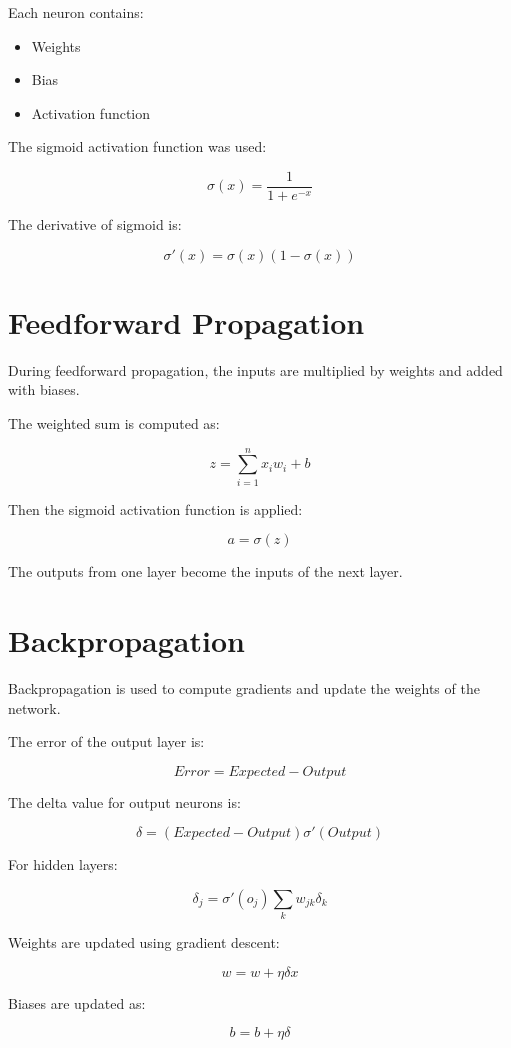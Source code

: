 \documentclass[a4paper,12pt]{article}
\begin{document}
Each neuron contains:
\begin{itemize}
    \item Weights
    \item Bias
    \item Activation function
\end{itemize}

The sigmoid activation function was used:

\[
\sigma(x) = \frac{1}{1 + e^{-x}}
\]

The derivative of sigmoid is:

\[
\sigma'(x) = \sigma(x)(1 - \sigma(x))
\]

\section{Feedforward Propagation}

During feedforward propagation, the inputs are multiplied by weights and added with biases.

The weighted sum is computed as:

\[
z = \sum_{i=1}^{n} x_i w_i + b
\]

Then the sigmoid activation function is applied:

\[
a = \sigma(z)
\]

The outputs from one layer become the inputs of the next layer.

\section{Backpropagation}

Backpropagation is used to compute gradients and update the weights of the network.

The error of the output layer is:

\[
Error = Expected - Output
\]

The delta value for output neurons is:

\[
\delta = (Expected - Output)\sigma'(Output)
\]

For hidden layers:

\[
\delta_j = \sigma'(o_j)\sum_k w_{jk}\delta_k
\]

Weights are updated using gradient descent:

\[
w = w + \eta \delta x
\]

Biases are updated as:

\[
b = b + \eta \delta
\]
\end{document}
